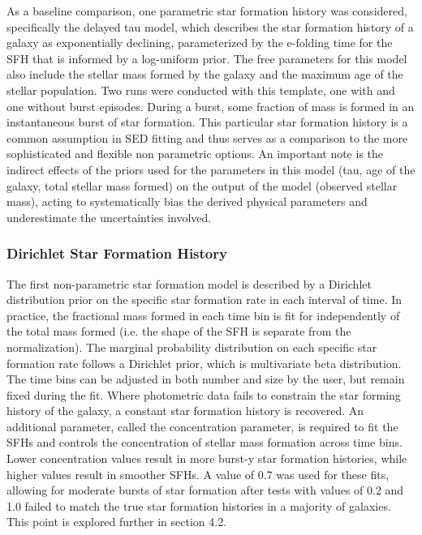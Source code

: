 \documentclass[twocolumn]{aastex62}
\begin{document}
As a baseline comparison, one parametric star formation history was considered, specifically the delayed tau model, which describes the star formation history of a galaxy as exponentially declining, parameterized by the e-folding time for the SFH that is informed by a log-uniform prior. The free parameters for this model also include the stellar mass formed by the galaxy and the maximum age of the stellar population. Two runs were conducted with this template, one with and one without burst episodes. During a burst, some fraction of mass is formed in an instantaneous burst of star formation. This particular star formation history is a common assumption in SED fitting and thus serves as a comparison to the more sophisticated and flexible non parametric options. An important note is the indirect effects of the priors used for the parameters in this model (tau, age of the galaxy, total stellar mass formed) on the output of the model (observed stellar mass), acting to systematically bias the derived physical parameters and underestimate the uncertainties involved.  


\subsubsection{Dirichlet Star Formation History}


The first non-parametric star formation model is described by a Dirichlet distribution prior on the specific star formation rate in each interval of time. In practice, the fractional mass formed in each time bin is fit for independently of the total mass formed (i.e. the shape of the SFH is separate from the normalization). The marginal probability distribution on each specific star formation rate follows a Dirichlet prior, which is multivariate beta distribution. The time bins can be adjusted in both number and size by the user, but remain fixed during the fit. Where photometric data fails to constrain the star forming history of the galaxy, a constant star formation history is recovered. An additional parameter, called the concentration parameter, is required to fit the SFHs and controls the concentration of stellar mass formation across time bins. Lower concentration values result in more burst-y star formation histories, while higher values result in smoother SFHs. A value of 0.7 was used for these fits, allowing for moderate bursts of star formation after tests with values of 0.2 and 1.0 failed to match the true star formation histories in a majority of galaxies. This point is explored further in section 4.2. 
\end{document}
